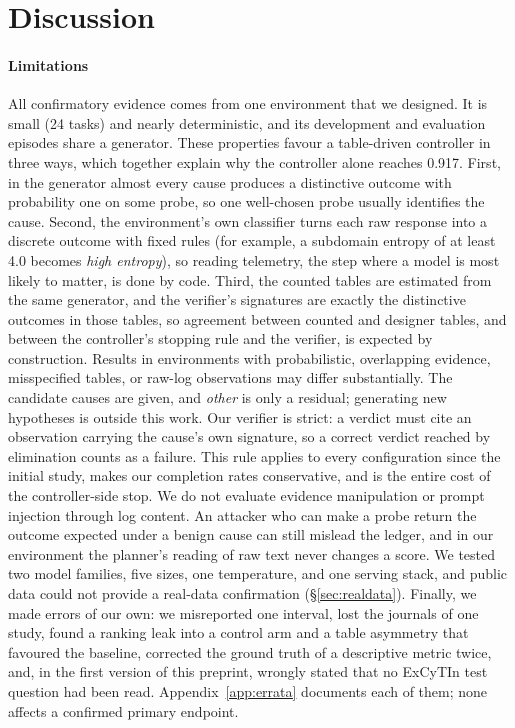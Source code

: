 \section{Discussion}
\label{sec:discussion}

\paragraph{Limitations} All confirmatory evidence comes from one environment that we designed. It is small (24 tasks) and nearly deterministic, and its development and evaluation episodes share a generator. These properties favour a table-driven controller in three ways, which together explain why the controller alone reaches 0.917. First, in the generator almost every cause produces a distinctive outcome with probability one on some probe, so one well-chosen probe usually identifies the cause. Second, the environment's own classifier turns each raw response into a discrete outcome with fixed rules (for example, a subdomain entropy of at least 4.0 becomes \textit{high entropy}), so reading telemetry, the step where a model is most likely to matter, is done by code. Third, the counted tables are estimated from the same generator, and the verifier's signatures are exactly the distinctive outcomes in those tables, so agreement between counted and designer tables, and between the controller's stopping rule and the verifier, is expected by construction. Results in environments with probabilistic, overlapping evidence, misspecified tables, or raw-log observations may differ substantially. The candidate causes are given, and \textit{other} is only a residual; generating new hypotheses is outside this work. Our verifier is strict: a verdict must cite an observation carrying the cause's own signature, so a correct verdict reached by elimination counts as a failure. This rule applies to every configuration since the initial study, makes our completion rates conservative, and is the entire cost of the controller-side stop. We do not evaluate evidence manipulation or prompt injection through log content. An attacker who can make a probe return the outcome expected under a benign cause can still mislead the ledger, and in our environment the planner's reading of raw text never changes a score. We tested two model families, five sizes, one temperature, and one serving stack, and public data could not provide a real-data confirmation (\S\ref{sec:realdata}). Finally, we made errors of our own: we misreported one interval, lost the journals of one study, found a ranking leak into a control arm and a table asymmetry that favoured the baseline, corrected the ground truth of a descriptive metric twice, and, in the first version of this preprint, wrongly stated that no ExCyTIn test question had been read. Appendix~\ref{app:errata} documents each of them; none affects a confirmed primary endpoint.

